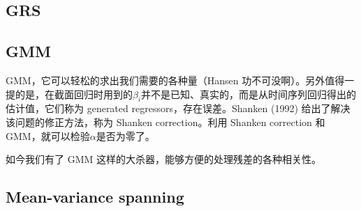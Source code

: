 \documentclass[11pt]{article}
\begin{document}
\subsection{GRS}

\subsection{GMM}

GMM，它可以轻松的求出我们需要的各种量（Hansen 功不可没啊）。另外值得一提的是，在截面回归时用到的$\beta_i$并不是已知、真实的，而是从时间序列回归得出的估计值，它们称为 generated regressors，存在误差。Shanken (1992) 给出了解决该问题的修正方法，称为 Shanken correction。利用 Shanken correction 和 GMM，就可以检验$\alpha$是否为零了。

如今我们有了 GMM 这样的大杀器，能够方便的处理残差的各种相关性。

\subsection{Mean-variance spanning}


\appendix
\end{document}
